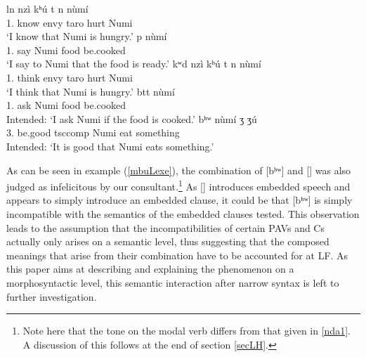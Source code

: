 \documentclass[output=paper,colorlinks,citecolor=brown]{langscibook}
\begin{document}
\ea \label{mbuLex}
    \begin{xlist}
    \ex \label{mbuLexa}
         {l\epH n} {\mbuL} {nzì} {kʰ{ú}} {\epL\epH t} {n\dz\epH} {n{ù}m{í}} \\
             {1.} {know} {} {envy} {taro} {} {hurt} {Numi} \\
        \glt `I know that Numi is hungry.'
    \ex \label{mbuLexb}
         {p} {n{ù}m{í}} {\mbuL} {\ch\schwaL{}} {\ds\textscb\schwaH} \\
             {1.} {say} {Numi} {} {food} {be.cooked} \\
        \glt `I say to Numi that the food is ready.'
    \ex \label{mbuLexc}
         {kʷ\epL d\schwaL} {\mbuL} {nzì} {kʰ{ú}} {\epL\epH t} {n\dz\epH} {n{ù}m{í}} \\
             {1.} {think} {} {envy} {taro} {} {hurt} {Numi} \\
        \glt `I think that Numi is hungry.'
    \ex \label{mbuLexd}
         {b\epH tt\schwaH} {n{ù}m{í}} {\mbuL} {\ch\schwaL{}} {\ds\textscb\schwaH} \\
             {1.} {ask} {Numi} {} {food} {be.cooked} \\
        \glt Intended: `I ask Numi if the food is cooked.'
    \ex \label{mbuLexe}
         {bʰʷ\ooL} {\mbuL} {n{ù}m{í}} {ʒ\baruH\baruL} {ʒ{ú}} \\
             {3.} {be.good} {tsc{comp}} {Numi} {eat} {something} \\
        \glt Intended: `It is good that Numi eats something.'
    \end{xlist}
\z

As can be seen in example (\ref{mbuLexe}), the combination of [bʰʷ\ooL] and [\mbuL] was also judged as infelicitous by our consultant.\footnote{Note here that the tone on the modal verb differs from that given in \ref{nda1}. A discussion of this follows at the end of section \ref{secLH}.} As [\mbuL] introduces embedded speech and appears to simply introduce an embedded clause, it could be that [bʰʷ\ooL] is simply incompatible with the semantics of the embedded clauses tested. This observation leads to the assumption that the incompatibilities of certain PAVs and Cs actually only arises on a semantic level, thus suggesting that the composed meanings that arise from their combination have to be accounted for at LF. As this paper aims at describing and explaining the phenomenon on a morphosyntactic level, this semantic interaction after narrow syntax is left to further investigation.
\end{document}
